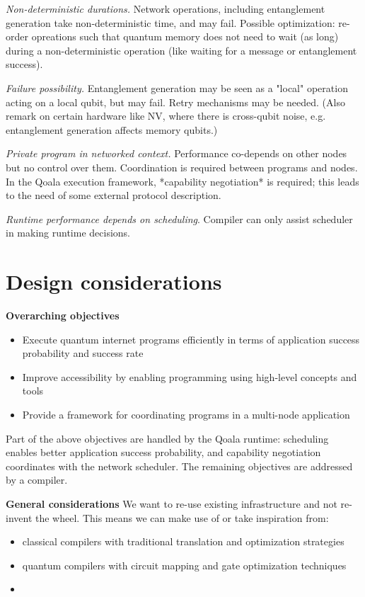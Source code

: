 \textit{Non-deterministic durations.} Network operations, including entanglement generation take non-deterministic time, and may fail.
Possible optimization: re-order opreations such that quantum memory does not need to wait (as long) during a non-deterministic operation (like waiting for a message or entanglement success).

\textit{Failure possibility.} Entanglement generation may be seen as a "local" operation acting on a local qubit, but may fail. Retry mechanisms may be needed.
(Also remark on certain hardware like NV, where there is cross-qubit noise, e.g. entanglement generation affects memory qubits.)

\textit{Private program in networked context.} Performance co-depends on other nodes but no control over them. Coordination is required between programs and nodes.
In the Qoala execution framework, *capability negotiation* is required; this leads to the need of some external protocol description.

\textit{Runtime performance depends on scheduling}. Compiler can only assist scheduler in making runtime decisions.




\section{Design considerations}

\textbf{Overarching objectives}
\begin{itemize}
\item Execute quantum internet programs efficiently in terms of application success probability and success rate
\item Improve accessibility by enabling programming using high-level concepts and tools
\item Provide a framework for coordinating programs in a multi-node application
\end{itemize}


Part of the above objectives are handled by the Qoala runtime: scheduling enables better application success probability, and capability negotiation coordinates with the network scheduler.
The remaining objectives are addressed by a compiler.

\textbf{General considerations}
We want to re-use existing infrastructure and not re-invent the wheel. This means we can make use of or take inspiration from:
\begin{itemize}
  \item classical compilers with traditional translation and optimization strategies
  \item quantum compilers with circuit mapping and gate optimization techniques
  \item {}
\end{itemize}

